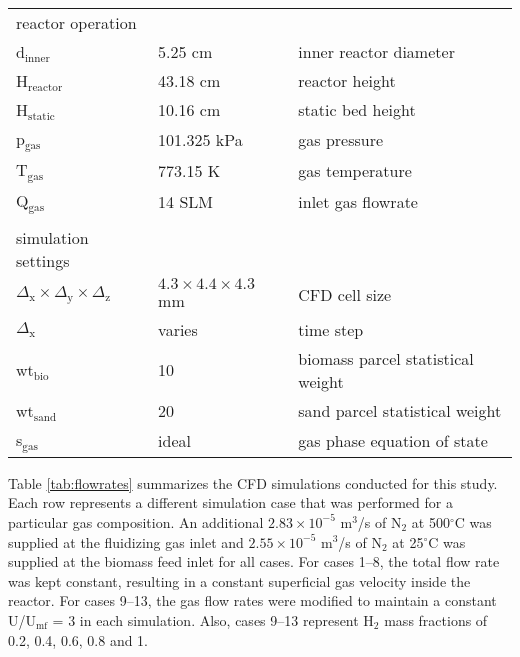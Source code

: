 \begin{table}[H]
\begin{tabular}{lll}
        \\
        reactor operation \\
        d$_\text{inner}$      & 5.25 cm       & inner reactor diameter \\
        H$_\text{reactor}$    & 43.18 cm      & reactor height \\
        H$_\text{static}$     & 10.16 cm      & static bed height \\
        p$_\text{gas}$        & 101.325 kPa   & gas pressure \\
        T$_\text{gas}$        & 773.15 K      & gas temperature \\
        Q$_\text{gas}$        & 14 SLM        & inlet gas flowrate \\
        \\
        simulation settings \\
        $\Delta_\text{x} \times \Delta_\text{y} \times \Delta_\text{z}$ & $4.3 \times 4.4 \times 4.3$ mm & CFD cell size \\
        $\Delta_\text{x}$   & varies & time step \\
        wt$_\text{bio}$      & 10     & biomass parcel statistical weight \\
        wt$_\text{sand}$     & 20     & sand parcel statistical weight \\
        s$_\text{gas}$               & ideal  & gas phase equation of state \\
        \bottomrule
    \end{tabular}
\end{table}

Table \ref{tab:flowrates} summarizes the CFD simulations conducted for this study. Each row represents a different simulation case that was performed for a particular gas composition. An additional $2.83\times10^{-5}$ m$^3$/s of N$_2$ at 500$^\circ$C was supplied at the fluidizing gas inlet and $2.55\times10^{-5}$ m$^3$/s of N$_2$ at 25$^\circ$C was supplied at the biomass feed inlet for all cases. For cases 1--8, the total flow rate was kept constant, resulting in a constant superficial gas velocity inside the reactor. For cases 9--13, the gas flow rates were modified to maintain a constant U/U$_\text{mf}$ = 3 in each simulation. Also, cases 9--13 represent H$_2$ mass fractions of 0.2, 0.4, 0.6, 0.8 and 1.


